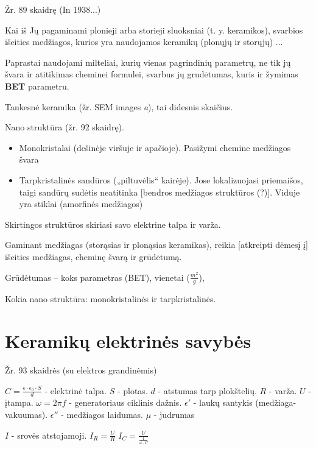 Žr. 89 skaidrę (In 1938...)

Kai iš Jų pagaminami plonieji arba storieji sluoksniai (t. y. keramikos),
svarbios išeities medžiagos, kurios yra naudojamos keramikų (plonųjų ir
storųjų) ...

Paprastai naudojami milteliai, kurių vienas pagrindinių parametrų,
ne tik jų švara ir atitikimas cheminei formulei,
svarbus jų grudėtumas, kuris ir žymimas \textbf{BET} parametru.

Tankesnė keramika (žr. SEM images \textit{a}), tai didesnis skaičius.

Nano struktūra (žr. 92 skaidrę).
\begin{itemize}
  \item Monokristalai (dešinėje viršuje ir apačioje). Pasižymi chemine
    medžiagos švara
  \item Tarpkristalinės sandūros („piltuvėlis“ kairėje).
    Jose lokalizuojasi priemaišos, taigi sandūrų sudėtis neatitinka
    [bendros medžiagos struktūros (?)]. Viduje yra stiklai (amorfinės
    medžiagos)
\end{itemize}
Skirtingos struktūros skiriasi savo elektrine talpa ir varža.

\begin{remember}
  \item Gaminant medžiagas (storąsias ir plonąsias keramikas), reikia
    [atkreipti dėmesį į] išeities medžiagas, cheminę švarą ir grūdėtumą.
  \item Grūdėtumas – koks parametras (BET), vienetai ($\frac{m^2}{g}$),
  \item Kokia nano struktūra: monokristalinės ir tarpkristalinės.
\end{remember}

\section{Keramikų elektrinės savybės}

Žr. 93 skaidrės (su elektros grandinėmis)

$C = \frac{\epsilon \cdot \epsilon_0 \cdot S}{d}$ - elektrinė talpa.
$S$ - plotas.
$d$ - atstumas tarp plokštelių.
$R$ - varža.
$U$ - įtampa.
$\omega = 2 \pi f$ - generatoriaus ciklinis dažnis.
$\epsilon'$ - laukų santykis (medžiaga-vakuumas).
$\epsilon''$ - medžiagos laidumas.
$\mu$ - judrumas

$I$ - srovės atstojamoji.
$I_R = \frac{U}{R}$
$I_C = \frac{U}{\frac{1}{\omega \cdot C}}$

